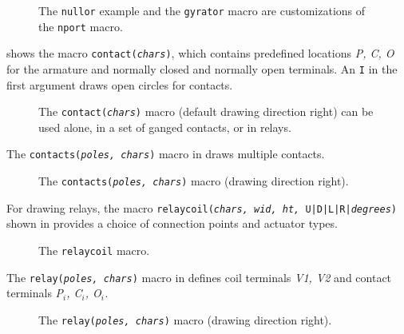 \begin{figure}[ht]
   
   \caption{The {\tt nullor} example and the {\tt gyrator}
    macro are customizations of the {\tt nport} macro.}
   \label{NLG}
   \end{figure}

 shows the macro {\tt contact({\sl chars})},
which contains predefined locations {\sl P, C, O}
for the armature and normally closed and normally
open terminals.
An {\tt I} in the first argument draws open circles for contacts.
\begin{figure}[ht]
   
   \caption{The {\tt contact({\sl chars})}
     macro (default drawing direction right)
     can be used alone, in a set of ganged contacts, or in relays.}%
   \label{Contact}
   \end{figure}

\pagebreak
The {\tt contacts({\sl poles, chars})} macro in 
draws multiple contacts.
\begin{figure}[h!t]
   
   \caption{The {\tt contacts({\sl poles, chars})}
     macro (drawing direction right).}
   \label{Contacts}
   \end{figure}

For drawing relays, the macro
 {\tt relaycoil({\sl chars, wid, ht,} {\tt U|D|L|R|}{\sl degrees})}
shown in  provides a choice of connection points and
actuator types. 

\begin{figure}[ht]
   
   \vspace{-1ex}
   \caption{The {\tt relaycoil} macro.}
   \label{relaycoil}
   \end{figure}

The {\tt relay({\sl poles, chars})} macro in 
defines coil terminals {\sl V1, V2} and contact
terminals {\sl P$_i$, C$_i$, O$_i$.}
\begin{figure}[ht]
   
   \vspace{-1ex}
   \caption{The {\tt relay({\sl poles, chars})}
     macro (drawing direction right).}
   \label{Relay}
   \end{figure}


